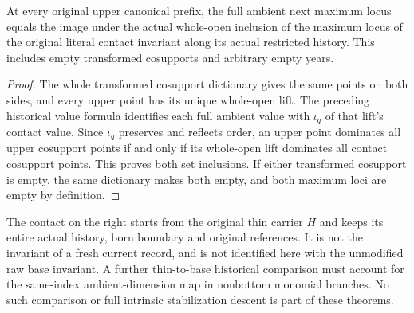 \begin{theorem}
\label{hir:disjoint-canonical-normal-maximum}
\leanok
At every original upper canonical prefix, the full ambient next maximum
locus equals the image under the actual whole-open inclusion of the maximum
locus of the original literal contact invariant along its actual restricted
history. This includes empty transformed cosupports and arbitrary empty years.
\end{theorem}
\begin{proof}
The whole transformed cosupport dictionary gives the same points on both
sides, and every upper point has its unique whole-open lift. The preceding
historical value formula identifies each full ambient value with $\iota_q$
of that lift's contact value. Since $\iota_q$ preserves and reflects order,
an upper point dominates all upper cosupport points if and only if its
whole-open lift dominates all contact cosupport points. This proves both
set inclusions. If either transformed cosupport is empty, the same
dictionary makes both empty, and both maximum loci are empty by definition.
\end{proof}

\begin{remark}
The contact on the right starts from the original thin carrier $H$ and keeps
its entire actual history, born boundary and original references. It is not
the invariant of a fresh current record, and is not identified here with the
unmodified raw base invariant. A further thin-to-base historical comparison
must account for the same-index ambient-dimension map in nonbottom monomial
branches. No such comparison or full intrinsic stabilization descent is
part of these theorems.
\end{remark}

